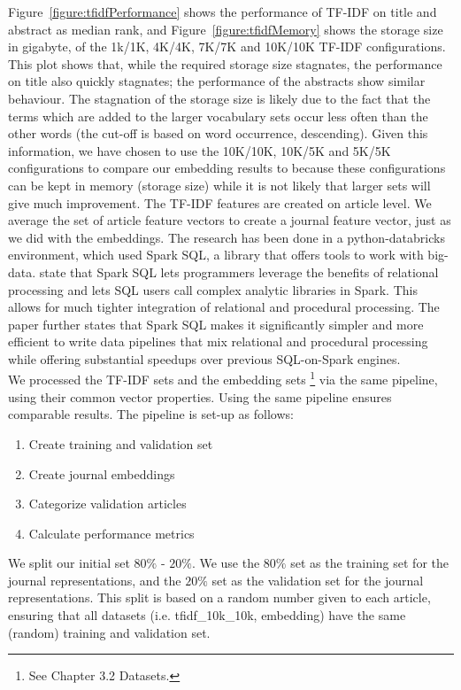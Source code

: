 \documentclass[../../Thesis.tex]{subfiles}
\begin{document}
\FloatBarrier
Figure~\ref{figure:tfidfPerformance} shows the performance of TF-IDF on title and abstract as median rank, and Figure~\ref{figure:tfidfMemory} shows the storage size in gigabyte, of the 1k/1K, 4K/4K, 7K/7K and 10K/10K TF-IDF configurations. This plot shows that, while the required storage size stagnates, the performance on title also quickly stagnates; the performance of the abstracts show similar behaviour. The stagnation of the storage size is likely due to the fact that the terms which are added to the larger vocabulary sets occur less often than the other words (the cut-off is based on word occurrence, descending). Given this information, we have chosen to use the 10K/10K, 10K/5K and 5K/5K configurations to compare our embedding results to because these configurations can be kept in memory (storage size) while it is not likely that larger sets will give much improvement. The TF-IDF features are created on article level. We average the set of article feature vectors to create a journal feature vector, just as we did with the embeddings. 
The research has been done in a python-databricks environment, which used Spark SQL, a library that offers tools to work with big-data. \citet{armbrust2015spark} state that Spark SQL lets programmers leverage the benefits of relational processing and lets SQL users call complex analytic libraries in Spark. This allows for much tighter integration of relational and procedural processing. The paper further states that Spark SQL makes it significantly simpler and more efficient to write data pipelines that mix relational and procedural processing while offering substantial speedups over previous SQL-on-Spark engines.\\
We processed the TF-IDF sets and the embedding sets \footnote{See Chapter 3.2 Datasets.} via the same pipeline, using their common vector properties. Using the same pipeline ensures comparable results. The pipeline is set-up as follows:
\begin{enumerate}
\item{Create training and validation set}
\item{Create journal embeddings}
\item{Categorize validation articles}
\item{Calculate performance metrics}
\end{enumerate}
We split our initial set  $80\%$ - $20\%$. We use the $80\%$ set as the training set for the journal representations, and the $20\%$ set as the validation set for the journal representations. This split is based on a random number given to each article, ensuring that all datasets (i.e. tfidf\_10k\_10k, embedding) have the same (random) training and validation set.
\end{document}

